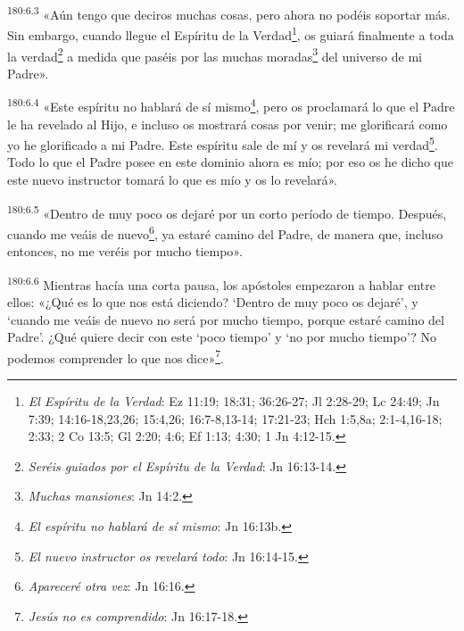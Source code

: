\par 
\textsuperscript{180:6.3} «Aún tengo que deciros muchas cosas, pero ahora no podéis soportar más. Sin embargo, cuando llegue el Espíritu de la Verdad\footnote{\textit{El Espíritu de la Verdad}: Ez 11:19; 18:31; 36:26-27; Jl 2:28-29; Lc 24:49; Jn 7:39; 14:16-18,23,26; 15:4,26; 16:7-8,13-14; 17:21-23; Hch 1:5,8a; 2:1-4,16-18; 2:33; 2 Co 13:5; Gl 2:20; 4:6; Ef 1:13; 4:30; 1 Jn 4:12-15.}, os guiará finalmente a toda la verdad\footnote{\textit{Seréis guiados por el Espíritu de la Verdad}: Jn 16:13-14.} a medida que paséis por las muchas moradas\footnote{\textit{Muchas mansiones}: Jn 14:2.} del universo de mi Padre».

\par 
\textsuperscript{180:6.4} «Este espíritu no hablará de sí mismo\footnote{\textit{El espíritu no hablará de sí mismo}: Jn 16:13b.}, pero os proclamará lo que el Padre le ha revelado al Hijo, e incluso os mostrará cosas por venir; me glorificará como yo he glorificado a mi Padre. Este espíritu sale de mí y os revelará mi verdad\footnote{\textit{El nuevo instructor os revelará todo}: Jn 16:14-15.}. Todo lo que el Padre posee en este dominio ahora es mío; por eso os he dicho que este nuevo instructor tomará lo que es mío y os lo revelará».

\par 
\textsuperscript{180:6.5} «Dentro de muy poco os dejaré por un corto período de tiempo. Después, cuando me veáis de nuevo\footnote{\textit{Apareceré otra vez}: Jn 16:16.}, ya estaré camino del Padre, de manera que, incluso entonces, no me veréis por mucho tiempo».

\par 
\textsuperscript{180:6.6} Mientras hacía una corta pausa, los apóstoles empezaron a hablar entre ellos: «¿Qué es lo que nos está diciendo? `Dentro de muy poco os dejaré', y `cuando me veáis de nuevo no será por mucho tiempo, porque estaré camino del Padre'. ¿Qué quiere decir con este `poco tiempo' y `no por mucho tiempo'? No podemos comprender lo que nos dice»\footnote{\textit{Jesús no es comprendido}: Jn 16:17-18.}.

